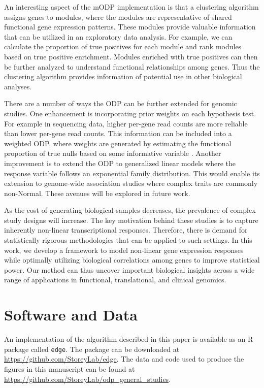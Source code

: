 \documentclass[11pt]{article}
\begin{document}
An interesting aspect of the mODP implementation is that a clustering algorithm assigns genes to modules, where the modules are representative of shared functional gene expression patterns. These modules provide valuable information that can be utilized in an exploratory data analysis. For example, we can calculate the proportion of true positives for each module and rank modules based on true positive enrichment. Modules enriched with true positives can then be further analyzed to understand functional relationships among genes. Thus the clustering algorithm provides information of potential use in other biological analyses.

There are a number of ways the ODP can be further extended for genomic studies. One enhancement is incorporating prior weights on each hypothesis test. For example in sequencing data, higher per-gene read counts are more reliable than lower per-gene read counts. This information can be included into a weighted ODP, where weights are generated by estimating the functional proportion of true nulls based on some informative variable \cite{chen2017}. Another improvement is to extend the ODP to generalized linear models where the response variable follows an exponential family distribution. This would enable its extension to genome-wide association studies where complex traits are commonly non-Normal. These avenues will be explored in future work.

As the cost of generating biological samples decreases, the prevalence of complex study designs will increase. The key motivation behind these studies is to capture inherently non-linear transcriptional responses. Therefore, there is demand for statistically rigorous methodologies that can be applied to such settings. In this work, we develop a framework to model non-linear gene expression responses while optimally utilizing biological correlations among genes to improve statistical power. Our method can thus uncover important biological insights across a wide range of applications in functional, translational, and clinical genomics.

\section{Software and Data\label{Sec:sdata}}

An implementation of the algorithm described in this paper is available as an R package called \texttt{edge}. The package can be downloaded at \url{https://github.com/StoreyLab/edge}. The data and code used to produce the figures in this manuscript can be found at \url{https://github.com/StoreyLab/odp_general_studies}.
\end{document}

